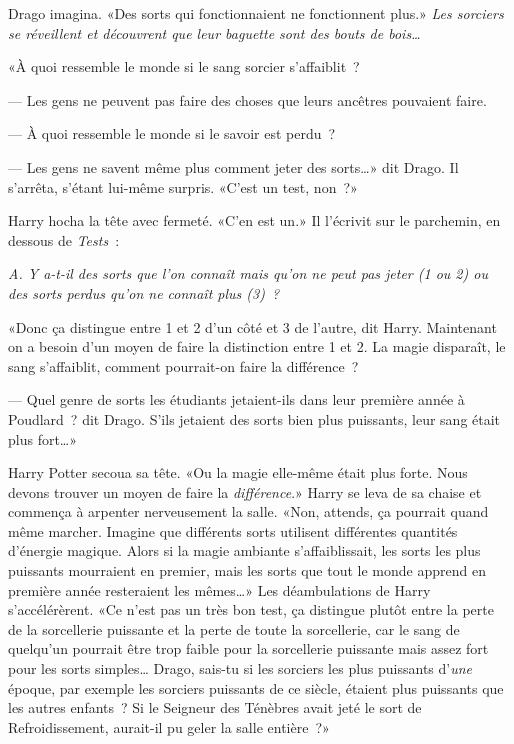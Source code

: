 Drago imagina. «Des sorts qui fonctionnaient ne fonctionnent plus.» \emph{Les sorciers se réveillent et découvrent que leur baguette sont des bouts de bois…}

«À quoi ressemble le monde si le sang sorcier s'affaiblit~?

--- Les gens ne peuvent pas faire des choses que leurs ancêtres pouvaient faire.

--- À quoi ressemble le monde si le savoir est perdu~?

--- Les gens ne savent même plus comment jeter des sorts…» dit Drago. Il s'arrêta, s'étant lui-même surpris. «C'est un test, non~?»

Harry hocha la tête avec fermeté. «C'en est un.» Il l'écrivit sur le parchemin, en dessous de \emph{Tests}~:

\emph{A. Y a-t-il des sorts que l'on connaît mais qu'on ne peut pas jeter (1 ou 2) ou des sorts perdus qu'on ne connaît plus (3)~?}

«Donc ça distingue entre 1 et 2 d'un côté et 3 de l'autre, dit Harry. Maintenant on a besoin d'un moyen de faire la distinction entre 1 et 2. La magie disparaît, le sang s'affaiblit, comment pourrait-on faire la différence~?

--- Quel genre de sorts les étudiants jetaient-ils dans leur première année à Poudlard~? dit Drago. S'ils jetaient des sorts bien plus puissants, leur sang était plus fort…»

Harry Potter secoua sa tête. «Ou la magie elle-même était plus forte. Nous devons trouver un moyen de faire la \emph{différence}.» Harry se leva de sa chaise et commença à arpenter nerveusement la salle. «Non, attends, ça pourrait quand même marcher. Imagine que différents sorts utilisent différentes quantités d'énergie magique. Alors si la magie ambiante s'affaiblissait, les sorts les plus puissants mourraient en premier, mais les sorts que tout le monde apprend en première année resteraient les mêmes…» Les déambulations de Harry s'accélérèrent. «Ce n'est pas un très bon test, ça distingue plutôt entre la perte de la sorcellerie puissante et la perte de toute la sorcellerie, car le sang de quelqu'un pourrait être trop faible pour la sorcellerie puissante mais assez fort pour les sorts simples… Drago, sais-tu si les sorciers les plus puissants d'\emph{une} époque, par exemple les sorciers puissants de ce siècle, étaient plus puissants que les autres enfants~? Si le Seigneur des Ténèbres avait jeté le sort de Refroidissement, aurait-il pu geler la salle entière~?»

